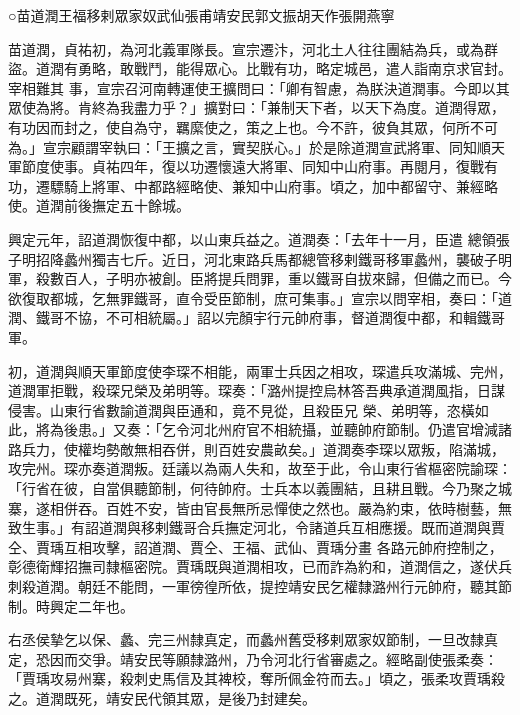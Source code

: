 
\begin{pinyinscope}

 ○苗道潤王福移剌眾家奴武仙張甫靖安民郭文振胡天作張開燕寧



 苗道潤，貞祐初，為河北義軍隊長。宣宗遷汴，河北土人往往團結為兵，或為群盜。道潤有勇略，敢戰鬥，能得眾心。比戰有功，略定城邑，遣人詣南京求官封。宰相難其
 事，宣宗召河南轉運使王擴問曰：「卿有智慮，為朕決道潤事。今即以其眾使為將。肯終為我盡力乎？」擴對曰：「兼制天下者，以天下為度。道潤得眾，有功因而封之，使自為守，羈縻使之，策之上也。今不許，彼負其眾，何所不可為。」宣宗顧謂宰執曰：「王擴之言，實契朕心。」於是除道潤宣武將軍、同知順天軍節度使事。貞祐四年，復以功遷懷遠大將軍、同知中山府事。再閱月，復戰有功，遷驃騎上將軍、中都路經略使、兼知中山府事。頃之，加中都留守、兼經略使。道潤前後撫定五十餘城。



 興定元年，詔道潤恢復中都，以山東兵益之。道潤奏：「去年十一月，臣遣
 總領張子明招降蠡州獨吉七斤。近日，河北東路兵馬都總管移剌鐵哥移軍蠡州，襲破子明軍，殺數百人，子明亦被創。臣將提兵問罪，重以鐵哥自拔來歸，但備之而已。今欲復取都城，乞無罪鐵哥，直令受臣節制，庶可集事。」宣宗以問宰相，奏曰：「道潤、鐵哥不協，不可相統屬。」詔以完顏宇行元帥府事，督道潤復中都，和輯鐵哥軍。



 初，道潤與順天軍節度使李琛不相能，兩軍士兵因之相攻，琛遣兵攻滿城、完州，道潤軍拒戰，殺琛兄榮及弟明等。琛奏：「潞州提控烏林答吾典承道潤風指，日謀侵害。山東行省數諭道潤與臣通和，竟不見從，且殺臣兄
 榮、弟明等，恣橫如此，將為後患。」又奏：「乞令河北州府官不相統攝，並聽帥府節制。仍遣官增減諸路兵力，使權均勢敵無相吞併，則百姓安農畝矣。」道潤奏李琛以眾叛，陷滿城，攻完州。琛亦奏道潤叛。廷議以為兩人失和，故至于此，令山東行省樞密院諭琛：「行省在彼，自當俱聽節制，何待帥府。士兵本以義團結，且耕且戰。今乃聚之城寨，遂相併吞。百姓不安，皆由官長無所忌憚使之然也。嚴為約束，依時樹藝，無致生事。」有詔道潤與移剌鐵哥合兵撫定河北，令諸道兵互相應援。既而道潤與賈仝、賈瑀互相攻擊，詔道潤、賈仝、王福、武仙、賈瑀分畫
 各路元帥府控制之，彰德衛輝招撫司隸樞密院。賈瑀既與道潤相攻，已而詐為約和，道潤信之，遂伏兵刺殺道潤。朝廷不能問，一軍徬徨所依，提控靖安民乞權隸潞州行元帥府，聽其節制。時興定二年也。



 右丞侯摯乞以保、蠡、完三州隸真定，而蠡州舊受移剌眾家奴節制，一旦改隸真定，恐因而交爭。靖安民等願隸潞州，乃令河北行省審處之。經略副使張柔奏：「賈瑀攻易州寨，殺刺史馬信及其裨校，奪所佩金符而去。」頃之，張柔攻賈瑀殺之。道潤既死，靖安民代領其眾，是後乃封建矣。




\end{pinyinscope}
